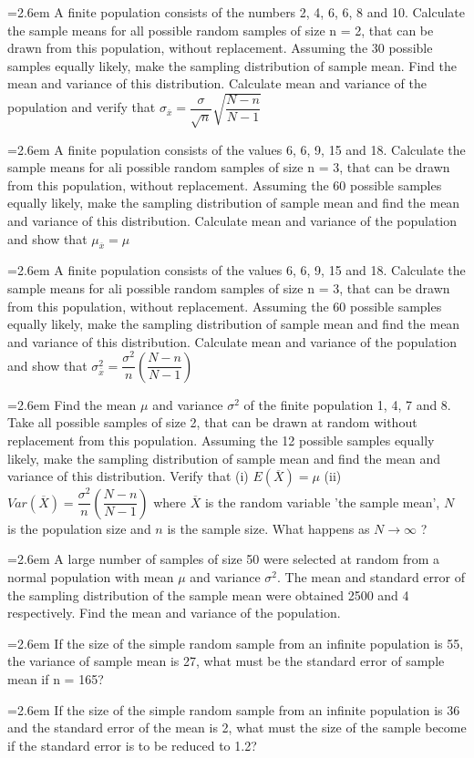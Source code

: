 \documentclass[11pt,a4paper]{article}
\newcommand{\Q}[2]{\par\smallskip\noindent\hangindent=2.6em\hangafter=1
  \makebox[2.6em][l]{\textbf{#1.}}#2\par}
\begin{document}
\Q{88}{A finite population consists of the numbers 2, 4, 6, 6, 8 and 10. Calculate the sample means for all possible random samples of size n = 2, that can be drawn from this population, without replacement. Assuming the 30 possible samples equally likely, make the sampling distribution of sample mean. Find the mean and variance of this distribution. Calculate mean and variance of the population and verify that $\sigma_{\overline{x}}=\dfrac{\sigma}{\sqrt{n}}\sqrt{\dfrac{N-n}{N-1}}$}
\Q{89}{A finite population consists of the values 6, 6, 9, 15 and 18. Calculate the sample means for ali possible random samples of size n = 3, that can be drawn from this population, without replacement. Assuming the 60 possible samples equally likely, make the sampling distribution of sample mean and find the mean and variance of this distribution. Calculate mean and variance of the population and show that $\mu_{\overline{x}}=\mu$}
\Q{90}{A finite population consists of the values 6, 6, 9, 15 and 18. Calculate the sample means for ali possible random samples of size n = 3, that can be drawn from this population, without replacement. Assuming the 60 possible samples equally likely, make the sampling distribution of sample mean and find the mean and variance of this distribution. Calculate mean and variance of the population and show that $\sigma^{2}_{\overline{x}}=\dfrac{\sigma^{2}}{n}\left(\dfrac{N-n}{N-1}\right)$}
\Q{91}{Find the mean $\mu$ and variance $\sigma^{2}$ of the finite population 1, 4, 7 and 8. Take all possible samples of size 2, that can be drawn at random without replacement from this population. Assuming the 12 possible samples equally likely, make the sampling distribution of sample mean and find the mean and variance of this distribution. Verify that (i) $E(\overline{X})=\mu$ (ii) $Var(\overline{X})=\dfrac{\sigma^{2}}{n}\left(\dfrac{N-n}{N-1}\right)$ where $\overline{X}$ is the random variable 'the sample mean', $N$ is the population size and $n$ is the sample size. What happens as $N\to\infty$ ?}
\Q{92}{A large number of samples of size 50 were selected at random from a normal population with mean $\mu$ and variance $\sigma^{2}$. The mean and standard error of the sampling distribution of the sample mean were obtained 2500 and 4 respectively. Find the mean and variance of the population.}
\Q{93}{If the size of the simple random sample from an infinite population is 55, the variance of sample mean is 27, what must be the standard error of sample mean if n = 165?}
\Q{94}{If the size of the simple random sample from an infinite population is 36 and the standard error of the mean is 2, what must the size of the sample become if the standard error is to be reduced to 1.2?}
\end{document}
